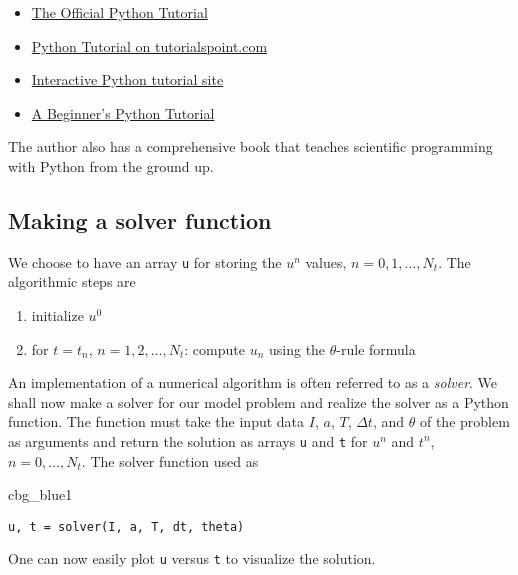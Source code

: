 \documentclass[graybox,sectrefs,envcountresetchap,open=right,final]{svmonodo}
\newenvironment{_cod_tight}[1]{
   \def\FrameCommand{\colorbox{#1}}
   \FrameRule0.6pt\MakeFramed {\FrameRestore}\vskip3mm}
   {\vskip0mm\endMakeFramed}
\newenvironment{cod}[1]{
\bgroup\rmfamily
\fboxsep=0mm\relax
\begin{_cod_tight}{#1}
\list{}{\parsep=-2mm\parskip=0mm\topsep=0pt\leftmargin=2mm
\rightmargin=2\leftmargin\leftmargin=4pt\relax}
\item\relax}
{\endlist\end{_cod_tight}\egroup}
\begin{document}
\begin{itemize}
  \item \href{{http://docs.python.org/2/tutorial/}}{The Official Python Tutorial}

  \item \href{{http://www.tutorialspoint.com/python/}}{Python Tutorial on tutorialspoint.com}

  \item \href{{http://www.learnpython.org/}}{Interactive Python tutorial site}

  \item \href{{http://en.wikibooks.org/wiki/A_Beginner's_Python_Tutorial}}{A Beginner's Python Tutorial}
\end{itemize}

\noindent
The author also has a comprehensive book \cite{Langtangen_2012} that teaches
scientific programming with Python from the ground up.



\subsection{Making a solver function}
\label{decay:py1}

We choose to have an array \texttt{u} for storing the $u^n$ values, $n=0,1,\ldots,N_t$.
The algorithmic steps are

\begin{enumerate}
 \item initialize $u^0$

 \item for $t=t_n$, $n=1,2,\ldots,N_t$: compute $u_n$ using
    the $\theta$-rule formula
\end{enumerate}

\noindent
An implementation of a numerical algorithm is often referred to as
a \emph{solver}. We shall now make a solver for our model problem and
realize the solver as a Python function. The function must take
the input data $I$, $a$, $T$, $\Delta t$, and $\theta$ of the problem
as arguments and return the solution as arrays \texttt{u} and \texttt{t} for
$u^n$ and $t^n$, $n=0,\ldots,N_t$. The solver function used as

\begin{cod}{cbg_blue1}\begin{Verbatim}[numbers=none,fontsize=\fontsize{9pt}{9pt},baselinestretch=0.95,xleftmargin=2mm]
u, t = solver(I, a, T, dt, theta)
\end{Verbatim}
\end{cod}
\noindent
One can now easily plot \texttt{u} versus \texttt{t} to visualize the solution.
\end{document}

